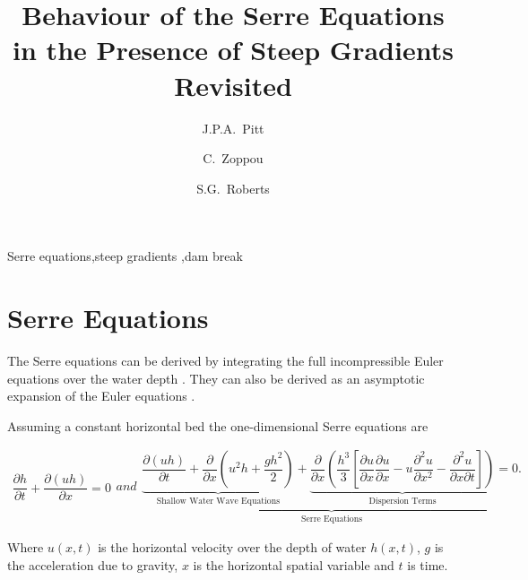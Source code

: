 \documentclass[times]{elsarticle}
\begin{document}
\title{Behaviour of the Serre Equations in the Presence of Steep Gradients Revisited}

\author[ANU]{J.P.A.~Pitt}
\author[ANU]{C.~Zoppou}
\author[ANU]{S.G.~Roberts}

\address[ANU]{Mathematical Sciences Institute, Australian National University, Canberra, ACT 0200, Australia}
 \begin{abstract}

 \end{abstract}	
 
  \begin{keyword}
  	Serre equations\sep steep gradients \sep dam break
  \end{keyword}
  
 \maketitle
\linenumbers

\section{Serre Equations}
\label{section:Serre Equations}
The Serre equations can be derived by integrating the full incompressible Euler equations over the water depth \cite{Su-Gardener-1969-536}. They can also be derived as an asymptotic expansion of the Euler equations \cite{Bonneton-Lannes-2009-16601}. 

Assuming a constant horizontal bed the one-dimensional Serre equations are \cite{Guyenne-etal-2014-169}
\begin{linenomath*}
\begin{subequations}\label{eq:Serre_nonconservative_form}
\begin{gather}
\dfrac{\partial h}{\partial t} + \dfrac{\partial (uh)}{\partial x} = 0
\label{eq:Serre_continuity}
\end{gather}
and
\begin{gather}
\underbrace{\underbrace{\dfrac{\partial (uh)}{\partial t} + \dfrac{\partial}{\partial x} \left ( u^2h + \dfrac{gh^2}{2}\right )}_{\text{Shallow Water Wave Equations}} + \underbrace{\dfrac{\partial}{\partial x} \left (  \dfrac{h^3}{3} \left [ \dfrac{\partial u }{\partial x} \dfrac{\partial u}{\partial x} - u\dfrac{\partial^2 u}{\partial x^2}  - \dfrac{\partial^2 u}{\partial x \partial t}\right ] \right )}_{\text{Dispersion Terms}} = 0.}_{\text{Serre Equations}}
\label{eq:Serre_momentum}
\end{gather}
\end{subequations}
\end{linenomath*}
Where $u(x,t)$ is the  horizontal velocity over the depth of water $h(x,t)$, $g$ is the acceleration due to gravity, $x$ is the horizontal spatial variable and $t$ is time. 
\end{document}
